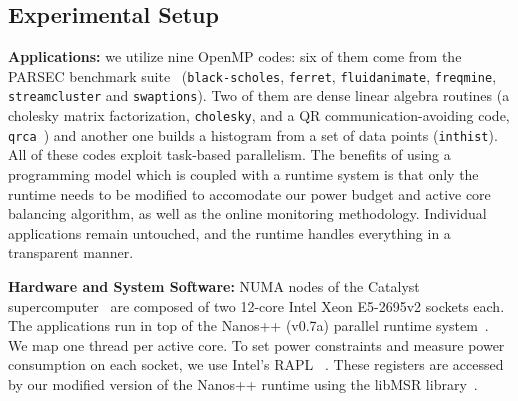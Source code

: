 \subsection{Experimental Setup}
\label{sec:setup}
{\bf Applications:} we utilize nine OpenMP codes: six of them come from the PARSEC
benchmark suite~\cite{bienia2008, Chasapis:2015:PEI:2836331.2829952} (\texttt{black-scholes}, \texttt{ferret},
\texttt{fluidanimate}, \texttt{freqmine}, \texttt{streamcluster} and \texttt{swaptions}).
Two  of them are dense linear algebra routines (a cholesky matrix factorization,
\texttt{cholesky}, and a QR communication-avoiding code, \texttt{qrca}~\cite{Demmel1997})
and another one builds a histogram from a set of data points (\texttt{inthist}).  All of
these codes exploit task-based parallelism.  The benefits of using a programming model
which is coupled with a runtime system is that only the runtime needs to be modified to
accomodate our power budget and active core balancing algorithm, as well as the online
monitoring methodology.  Individual applications remain untouched, and the runtime handles
everything in a transparent manner.

{\bf Hardware and System Software:} NUMA nodes of the Catalyst
supercomputer~\cite{llnlconfluence} are composed of  two 12-core Intel Xeon E5-2695v2
sockets each. The applications run in top of the Nanos++ (v0.7a) parallel runtime
system~\cite{nanos}. We map one thread per active core.  To set power constraints and
measure power consumption on each socket, we use Intel's RAPL~\cite{IntelArcManual} .
These registers are accessed by our modified version of the Nanos++ runtime using the
libMSR library~\cite{libmsr}. 



